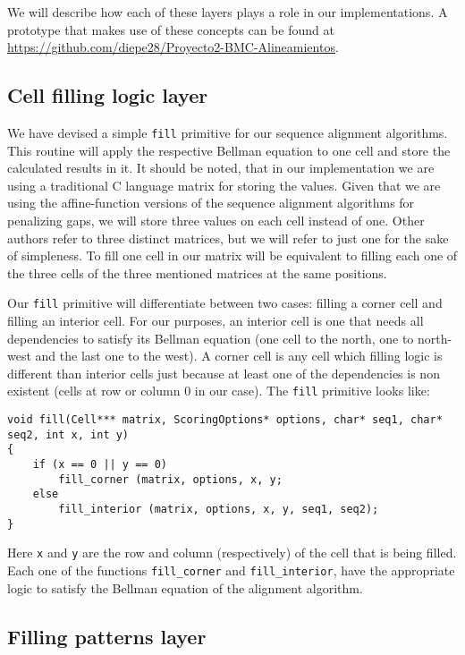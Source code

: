 \documentclass[journal]{IEEEtran}
\begin{document}
We will describe how each of these layers plays a role in our implementations. A prototype that makes use of these concepts can be found at \url{https://github.com/diepe28/Proyecto2-BMC-Alineamientos}.

\subsection{Cell filling logic layer}

We have devised a simple {\tt fill} primitive for our sequence alignment algorithms. This routine will apply the respective Bellman equation to one cell and store the calculated results in it. It should be noted, that in our implementation we are using a traditional C language matrix for storing the values. Given that we are using the affine-function versions of the sequence alignment algorithms for penalizing gaps, we will store three values on each cell instead of one. Other authors refer to three distinct matrices, but we will refer to just one for the sake of simpleness. To fill one cell in our matrix will be equivalent to filling each one of the three cells of the three mentioned matrices at the same positions.

Our {\tt fill} primitive will differentiate between two cases: filling a corner cell and filling an interior cell. For our purposes, an interior cell is one that needs all dependencies to satisfy its Bellman equation (one cell to the north, one to north-west and the last one to the west). A corner cell is any cell which filling logic is different than interior cells just because at least one of the dependencies is non existent (cells at row or column $0$ in our case). The  {\tt fill} primitive looks like:


\lstset{language=C}
\begin{lstlisting}[linewidth=\columnwidth,breaklines=true]
void fill(Cell*** matrix, ScoringOptions* options, char* seq1, char* seq2, int x, int y) 
{
	if (x == 0 || y == 0)
		fill_corner (matrix, options, x, y;
	else
		fill_interior (matrix, options, x, y, seq1, seq2);
}
\end{lstlisting}

Here {\tt x} and {\tt y} are the row and column (respectively) of the cell that is being filled. Each one of the functions {\tt fill\_corner} and {\tt fill\_interior}, have the appropriate logic to satisfy the Bellman equation of the alignment algorithm. 

\subsection{Filling patterns layer}
\end{document}
